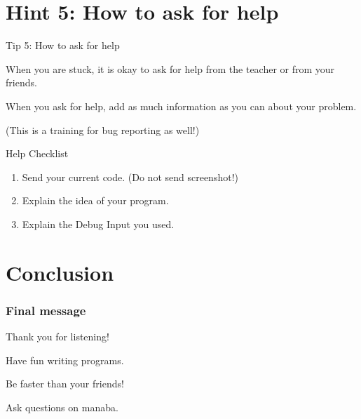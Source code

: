 
\section{Hint 5: How to ask for help}

\begin{frame}{Tip 5: How to ask for help}

  When you are stuck, it is okay to ask for help from the teacher or from your friends.\bigskip

  When you ask for help, add as much information as you can about your problem.\bigskip

  (This is a training for bug reporting as well!)\bigskip

  \begin{block}{Help Checklist}
  \begin{enumerate}
    \item Send your current code. (Do not send screenshot!)\medskip

    \item Explain the idea of your program.\medskip

    \item Explain the Debug Input you used.\medskip
  \end{enumerate}
  \end{block}
\end{frame}

\section{Conclusion}

\begin{frame}\frametitle{Final message}
  Thank you for listening!\vfill

  Have fun writing programs.\vfill

  Be faster than your friends!\vfill

  Ask questions on manaba.
\end{frame}
